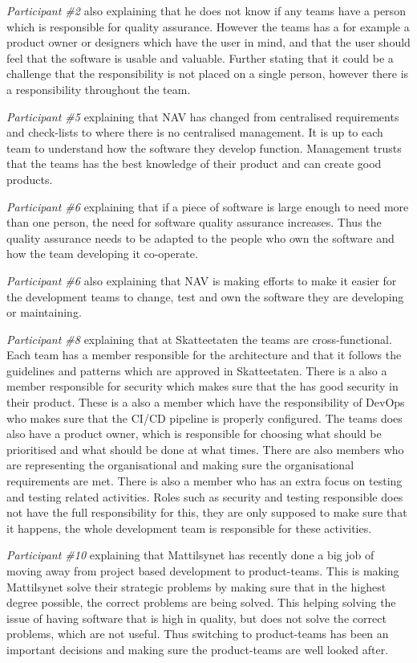\textit{Participant \#2} also explaining that he does not know if any teams have a person which is responsible for quality assurance. However the teams has a for example a product owner or designers which have the user in mind, and that the user should feel that the software is usable and valuable. Further stating that it could be a challenge that the responsibility is not placed on a single person, however there is a responsibility throughout the team.

\textit{Participant \#5} explaining that NAV has changed from centralised requirements and check-lists to where there is no centralised management. It is up to each team to understand how the software they develop function. Management trusts that the teams has the best knowledge of their product and can create good products.

\textit{Participant \#6} explaining that if a piece of software is large enough to need more than one person, the need for software quality assurance increases. Thus the quality assurance needs to be adapted to the people who own the software and how the team developing it co-operate. 

\textit{Participant \#6} also explaining that NAV is making efforts to make it easier for the development teams to change, test and own the software they are developing or maintaining.

\textit{Participant \#8} explaining that at Skatteetaten the teams are cross-functional. Each team has a member responsible for the architecture and that it follows the guidelines and patterns which are approved in Skatteetaten. There is a also a member responsible for security which makes sure that the has good security in their product. These is a also a member which have the responsibility of DevOps who makes sure that the CI/CD pipeline is properly configured. The teams does also have a product owner, which is responsible for choosing what should be prioritised and what should be done at what times. There are also members who are representing the organisational and making sure the organisational requirements are met. There is also a member who has an extra focus on testing and testing related activities. Roles such as security and testing responsible does not have the full responsibility for this, they are only supposed to make sure that it happens, the whole development team is responsible for these activities. 

\textit{Participant \#10} explaining that Mattilsynet has recently done a big job of moving away from project based development to product-teams. This is making Mattilsynet solve their strategic problems by making sure that in the highest degree possible, the correct problems are being solved. This helping solving the issue of having software that is high in quality, but does not solve the correct problems, which are not useful. Thus switching to product-teams has been an important decisions and making sure the product-teams are well looked after.

